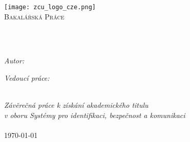 \frontmatter %

\pagestyle{plain} %

\begin{titlepage}
\begin{center}
\texttt{[image: zcu\_logo\_cze.png]} %
\\\vspace{3cm}
\textsc{\Large Bakalářská Práce}\\[0.2cm] 	 %

\HRule \\[0.4cm] %
{\huge \bfseries \ttitle\par}\vspace{0.4cm} %
\HRule \\[1.5cm] %
 
\begin{minipage}[t]{0.45\textwidth}
\begin{flushleft} \large
\emph{Autor:}\\{\authorname}
\end{flushleft}
\end{minipage}
\begin{minipage}[t]{0.45\textwidth}
\begin{flushright} \large
\emph{Vedoucí práce:} \\
\href{http://www.kky.zcu.cz/cs/people/bulin-martin}{\supname}
\end{flushright}
\end{minipage}\\[2.5cm]
 
\large \textit{Závěrečná práce k získání akademického titulu  \degreename} \\[0.3cm] %
\textit{v oboru Systémy pro identifikaci, bezpečnost a komunikaci}\\[0.4cm]

\deptname %
 \\\vspace{2cm}
{\large \today} 
 
\vfill
\end{center}
\end{titlepage}